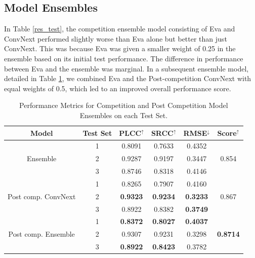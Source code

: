 \documentclass[a4paper,12pt,openright]{book}
\begin{document}
\subsection{Model Ensembles}

In Table \ref{res_test}, the competition ensemble model consisting of Eva and ConvNext performed slightly worse than Eva alone but better than just ConvNext. This was because Eva was given a smaller weight of 0.25 in the ensemble based on its initial test performance. The difference in performance between Eva and the ensemble was marginal. In a subsequent ensemble model, detailed in Table \ref{res_ensemble}, we combined Eva and the Post-competition ConvNext with equal weights of 0.5, which led to an improved overall performance score.
\begin{table}[h]

\smallskip
\begin{center}
\begin{tabular}{ | c | c | c | c | c | c | }
\hline  
  \textbf{Model} & \textbf{Test Set} & \textbf{PLCC$^{\uparrow}$} & \textbf{SRCC$^{\uparrow}$} & \textbf{RMSE$^{\downarrow}$} &
  \textbf{Score$^{\uparrow}$}\\ 

\hline

  \multirow{3}{*}{Ensemble} & 1 & 0.8091 & 0.7633 & 0.4352 & \multirow{3}{*}{0.854} \\
                            & 2 & 0.9287 &
                            0.9197 & 0.3447  & \\
                            & 3 & 0.8746 & 0.8318& 0.4146 & \\
                            \hline

  \multirow{3}{*}{Post comp. ConvNext} & 1 & 0.8265 & 0.7907 & 0.4160 & \multirow{3}{*}{0.867} \\
                            & 2 & \textbf{0.9323} &  \textbf{0.9234} & \textbf{0.3233}  & \\
                            & 3 &  0.8922 & 0.8382 & \textbf{0.3749} & \\
\hline  

  \multirow{3}{*}{Post comp. Ensemble} & 1 & \textbf{0.8372} & \textbf{0.8027} & \textbf{0.4037} & \multirow{3}{*}{\textbf{0.8714}} \\
                            & 2 &  0.9307 & 0.9231 & 0.3298  & \\
                            & 3 & \textbf{ 0.8922} & \textbf{0.8423} & 0.3782 & \\
\hline  
\end{tabular}
\end{center}
\caption{Performance Metrics for Competition and Post Competition Model Ensembles on each Test Set.}
\label{res_ensemble}
\end{table}
\newpage
\end{document}
